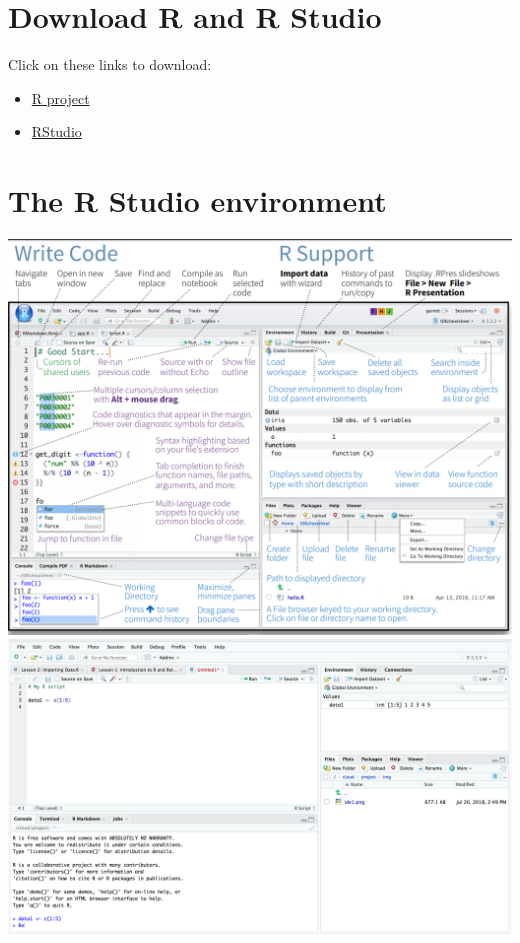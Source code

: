 \documentclass[
]{book}
\providecommand{\tightlist}{%
  \setlength{\itemsep}{0pt}\setlength{\parskip}{0pt}}
\begin{document}
\hypertarget{download-r-and-r-studio}{%
\section{Download R and R Studio}\label{download-r-and-r-studio}}

Click on these links to download:

\begin{itemize}
\tightlist
\item
  \href{https://cran.r-project.org/}{R project}
\item
  \href{https://rstudio.com/}{RStudio}
\end{itemize}

\hypertarget{the-r-studio-environment}{%
\section{The R Studio environment}\label{the-r-studio-environment}}

\includegraphics{images/rstudio_ide.png}
\includegraphics{images/rstudio1.png}
\end{document}
